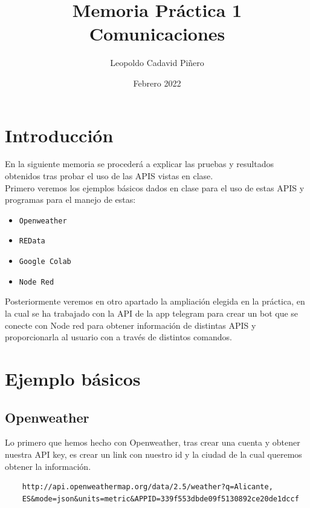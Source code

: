 \documentclass[12pt]{article}
\title{Memoria Práctica 1 \\


\large Comunicaciones
}
\author{
Leopoldo Cadavid Piñero
}
\date{Febrero 2022}
\begin{document}
\maketitle
\tableofcontents
\section{Introducción}

      En la siguiente memoria se procederá a explicar las pruebas y resultados obtenidos tras probar el uso de 
      las APIS vistas en clase.\\

      Primero veremos los ejemplos básicos dados en clase para el uso de estas APIS y programas para el manejo de estas:

      \begin{itemize}
        \item \verb|Openweather| 
        \item \verb|REData | 
        \item \verb|Google Colab| 
        \item \verb|Node Red| 
        
    
        
    
        
    \end{itemize}

      Posteriormente veremos en otro apartado la ampliación elegida en la práctica, en la cual se ha 
      trabajado con la API de la app telegram para crear un bot que se conecte con Node red para obtener información de distintas APIS y proporcionarla
      al usuario con a través de distintos comandos.
      

\section{Ejemplo básicos}

\subsection{Openweather}

Lo primero que hemos hecho con Openweather, tras crear una cuenta y obtener nuestra API key, es crear un link  con nuestro id y la 
ciudad de la cual queremos obtener la información.\\

\begin{verbatim}
    http://api.openweathermap.org/data/2.5/weather?q=Alicante,
    ES&mode=json&units=metric&APPID=339f553dbde09f5130892ce20de1dccf
\end{verbatim}
    
\end{document}
